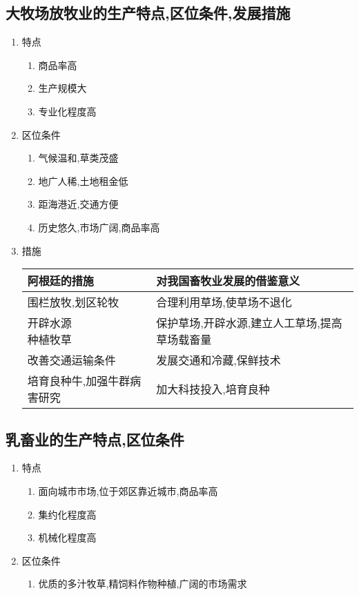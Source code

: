 \documentclass[a4paper]{article}
\begin{document}
    \subsection{大牧场放牧业的生产特点,区位条件,发展措施}
    \begin{enumerate}
        \item 特点
        \begin{enumerate}
            \item 商品率高
            \item 生产规模大
            \item 专业化程度高
        \end{enumerate}
        \item 区位条件
        \begin{enumerate}
            \item 气候温和,草类茂盛
            \item 地广人稀,土地租金低
            \item 距海港近,交通方便
            \item 历史悠久,市场广阔,商品率高
        \end{enumerate}
        \item 措施\\
            \begin{tabular}{|l|l|} %
                \hline
                阿根廷的措施    &   对我国畜牧业发展的借鉴意义  \\
                \hline
                围栏放牧,划区轮牧   &   合理利用草场,使草场不退化   \\
                \hline
                \makecell[l]{开辟水源 \\ 种植牧草}  & 保护草场,开辟水源,建立人工草场,提高草场载畜量   \\
                \hline
                改善交通运输条件    &   发展交通和冷藏,保鲜技术    \\
                \hline
                培育良种牛,加强牛群病害研究 &   加大科技投入,培育良种   \\
                \hline
            \end{tabular}
    \end{enumerate}
    \subsection{乳畜业的生产特点,区位条件}
    \begin{enumerate}
        \item 特点
        \begin{enumerate}
            \item 面向城市市场,位于郊区靠近城市,商品率高
            \item 集约化程度高
            \item 机械化程度高
        \end{enumerate}
        \item 区位条件
        \begin{enumerate}
            \item 优质的多汁牧草,精饲料作物种植,广阔的市场需求
        \end{enumerate}
    \end{enumerate}
\end{document}
